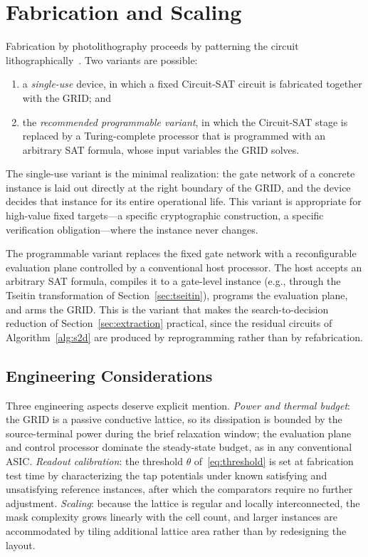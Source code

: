 \documentclass[letterpaper,journal]{IEEEtran}
\begin{document}
\section{Fabrication and Scaling}
\label{sec:fab}

Fabrication by photolithography proceeds by patterning the circuit
lithographically~\cite{mack2007}. Two variants are possible:
\begin{enumerate}
  \item a \emph{single-use} device, in which a fixed Circuit-SAT circuit is
        fabricated together with the GRID; and
  \item the \emph{recommended programmable variant}, in which the Circuit-SAT
        stage is replaced by a Turing-complete processor that is programmed
        with an arbitrary SAT formula, whose input variables the GRID solves.
\end{enumerate}
The single-use variant is the minimal realization: the gate network of a
concrete instance is laid out directly at the right boundary of the GRID,
and the device decides that instance for its entire operational life. This
variant is appropriate for high-value fixed targets---a specific
cryptographic construction, a specific verification obligation---where the
instance never changes.

The programmable variant replaces the fixed gate network with a
reconfigurable evaluation plane controlled by a conventional host
processor. The host accepts an arbitrary SAT formula, compiles it to a
gate-level instance (e.g., through the Tseitin transformation of
Section~\ref{sec:tseitin}), programs the evaluation plane, and arms the
GRID. This is the variant that makes the search-to-decision reduction of
Section~\ref{sec:extraction} practical, since the residual circuits of
Algorithm~\ref{alg:s2d} are produced by reprogramming rather than by
refabrication.

\subsection{Engineering Considerations}
Three engineering aspects deserve explicit mention. \emph{Power and
thermal budget}: the GRID is a passive conductive lattice, so its
dissipation is bounded by the source-terminal power during the brief
relaxation window; the evaluation plane and control processor dominate
the steady-state budget, as in any conventional ASIC. \emph{Readout
calibration}: the threshold $\theta$ of~\eqref{eq:threshold} is set at
fabrication test time by characterizing the tap potentials under known
satisfying and unsatisfying reference instances, after which the
comparators require no further adjustment. \emph{Scaling}: because the
lattice is regular and locally interconnected, the mask complexity grows
linearly with the cell count, and larger instances are accommodated by
tiling additional lattice area rather than by redesigning the layout.
\end{document}
